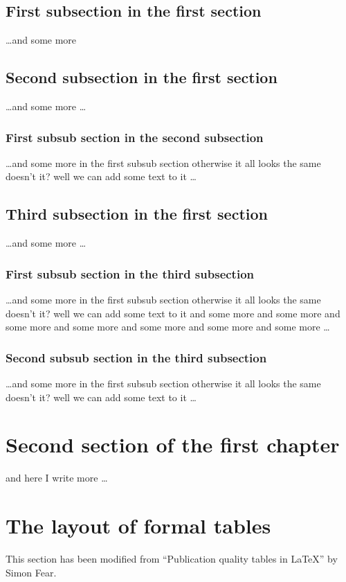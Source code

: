 \subsection{First subsection in the first section}
\dots and some more

\subsection{Second subsection in the first section}
\dots and some more \dots

\subsubsection{First subsub section in the second subsection}
\dots and some more in the first subsub section otherwise it all looks the same
doesn't it? well we can add some text to it \dots

\subsection{Third subsection in the first section}
\dots and some more \dots

\subsubsection{First subsub section in the third subsection}
\dots and some more in the first subsub section otherwise it all looks the same
doesn't it? well we can add some text to it and some more and some more and
some more and some more and some more and some more and some more \dots

\subsubsection{Second subsub section in the third subsection}
\dots and some more in the first subsub section otherwise it all looks the same
doesn't it? well we can add some text to it \dots

\section{Second section of the first chapter}
and here I write more \dots

\section{The layout of formal tables}
This section has been modified from ``Publication quality tables in \LaTeX*''
 by Simon Fear.

